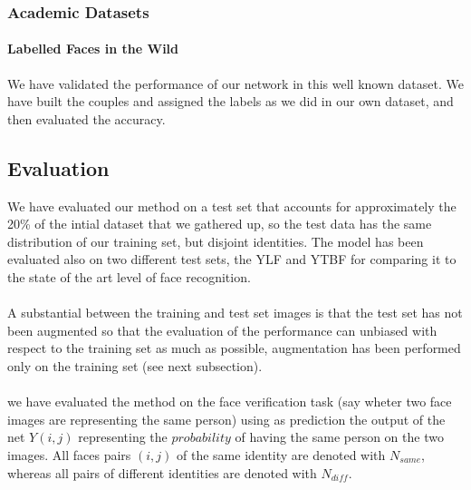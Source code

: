 
\subsubsection{Academic Datasets}
\paragraph{Labelled Faces in the Wild} We have validated the performance of our network in this well known dataset. We have built the couples and assigned the labels as we did in our own dataset, and then evaluated the accuracy.


\subsection{Evaluation}
We have evaluated our method on a test set that accounts for approximately the 20\% of the intial dataset that we gathered up, so the test data has the same distribution of our training set, but disjoint identities.
The model has been evaluated also on two different test sets, the YLF and YTBF for comparing it to the state of the art level of face recognition. 
\paragraph{}
A substantial between the training and test set images is that the test set has not been augmented so that the evaluation of the performance can unbiased with respect to the training set as much as possible, augmentation has been performed only on the training set (see next subsection).
\paragraph{}
we have evaluated the method on the face verification task (say wheter two face images are representing the same person) using as prediction the output of the net $Y(i,j)$ representing the $probability$ of having the same person on the two images. All faces pairs $(i,j)$ of the same identity are denoted with $N_{same}$, whereas all pairs of different identities are denoted with $N_{diff}$.\\
 
